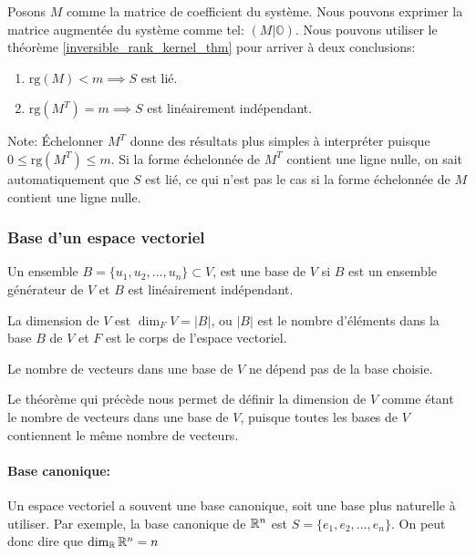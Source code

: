 Posons $M$ comme la matrice de coefficient du système. Nous pouvons exprimer la matrice augmentée du système comme tel: $(M | \mathbb{O})$. Nous pouvons utiliser le théorème \ref{inversible_rank_kernel_thm} pour arriver à deux conclusions: 
\begin{enumerate}[1.]
      \item $\text{rg}(M) < m \implies S$ est lié.
      \item $\text{rg}(M^T) = m \implies S$ est linéairement indépendant.
\end{enumerate}
Note: Échelonner $M^T$ donne des résultats plus simples à interpréter puisque
$0 \leq \text{rg}(M^T) \leq m$. Si la forme échelonnée de $M^T$ contient une ligne nulle,
on sait automatiquement que $S$ est lié, ce qui n'est pas le cas si la forme échelonnée de $M$ 
contient une ligne nulle.

\subsubsection{Base d'un espace vectoriel}
\begin{definition}
      Un ensemble $B = \{ u_1, u_2, \ldots, u_n \} \subset V$, est une base de $V$ si
      $B$ est un ensemble générateur de $V$ et $B$ est linéairement indépendant.
\end{definition}
\begin{definition}
      La dimension de $V$ est $\dim_F V = |B|$, ou $|B|$ est le nombre d'éléments dans la base $B$
      de $V$ et $F$ est le corps de l'espace vectoriel.
\end{definition}
\begin{theorem}
      Le nombre de vecteurs dans une base de $V$ ne dépend pas de la base choisie.
\end{theorem}
\begin{remark}
      Le théorème qui précède nous permet de définir la dimension de $V$ comme étant le
      nombre de vecteurs dans une base de $V$, puisque toutes les bases de $V$ contiennent
      le même nombre de vecteurs.
\end{remark}
\paragraph{Base canonique:}
Un espace vectoriel a souvent une base canonique, soit une base plus naturelle à utiliser.
Par exemple, la base canonique de $\mathbb{R}^n$ est $S = \{ e_1, e_2, \ldots, e_n \}$.
On peut donc dire que $\dim_{\mathbb{R}} \mathbb{R}^n = n$

